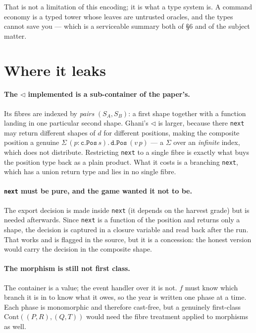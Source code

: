 \documentclass[11pt,a4paper]{article}
\begin{document}
\noindent That is not a limitation of this encoding; it is what a type system
is. A command economy is a typed tower whose leaves are untrusted oracles, and
the types cannot save you --- which is a serviceable summary both of \S6 and of
the subject matter.

\section{Where it leaks}

\paragraph{The $\lhd$ implemented is a sub-container of the paper's.} Its
fibres are indexed by \emph{pairs} $(S_A, S_B)$: a first shape together with a
function landing in one particular second shape. Ghani's $\lhd$ is larger,
because there \verb|next| may return different shapes of $d$ for different
positions, making the composite position a genuine
$\Sigma\,(p : \texttt{c.Pos}\,s).\,\texttt{d.Pos}\,(v\,p)$ --- a $\Sigma$ over
an \emph{infinite} index, which does not distribute. Restricting \verb|next| to
a single fibre is exactly what buys the position type back as a plain product.
What it costs is a branching \verb|next|, which has a union return type and
lies in no single fibre.

\paragraph{\texttt{next} must be pure, and the game wanted it not to be.} The
export decision is made inside \verb|next| (it depends on the harvest grade)
but is needed afterwards. Since \verb|next| is a function of the position and
returns only a shape, the decision is captured in a closure variable and read
back after the run. That works and is flagged in the source, but it is a
concession: the honest version would carry the decision in the composite shape.

\paragraph{The morphism is still not first class.} The container is a value;
the event handler over it is not. $f$ must know which branch it is in to know
what it owes, so the year is written one phase at a time. Each phase is
monomorphic and therefore cast-free, but a genuinely first-class
$\mathrm{Cont}((P,R),(Q,T))$ would need the fibre treatment applied to
morphisms as well.
\end{document}
